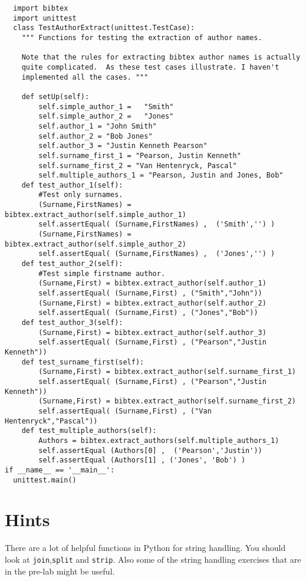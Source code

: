 \documentclass[10pt]{paper}
\begin{document}
\begin{lstlisting}
  import bibtex
  import unittest
  class TestAuthorExtract(unittest.TestCase):
    """ Functions for testing the extraction of author names.

    Note that the rules for extracting bibtex author names is actually
    quite complicated.  As these test cases illustrate. I haven't
    implemented all the cases. """

    def setUp(self):
        self.simple_author_1 =   "Smith"
        self.simple_author_2 =   "Jones"
        self.author_1 = "John Smith"
        self.author_2 = "Bob Jones"
        self.author_3 = "Justin Kenneth Pearson"
        self.surname_first_1 = "Pearson, Justin Kenneth"
        self.surname_first_2 = "Van Hentenryck, Pascal"
        self.multiple_authors_1 = "Pearson, Justin and Jones, Bob"
    def test_author_1(self):
        #Test only surnames.
        (Surname,FirstNames) = bibtex.extract_author(self.simple_author_1)
        self.assertEqual( (Surname,FirstNames) ,  ('Smith','') )
        (Surname,FirstNames) = bibtex.extract_author(self.simple_author_2)
        self.assertEqual( (Surname,FirstNames) ,  ('Jones','') )
    def test_author_2(self):
        #Test simple firstname author.
        (Surname,First) = bibtex.extract_author(self.author_1)
        self.assertEqual( (Surname,First) , ("Smith","John"))
        (Surname,First) = bibtex.extract_author(self.author_2)
        self.assertEqual( (Surname,First) , ("Jones","Bob"))
    def test_author_3(self):
        (Surname,First) = bibtex.extract_author(self.author_3)
        self.assertEqual( (Surname,First) , ("Pearson","Justin Kenneth"))
    def test_surname_first(self):
        (Surname,First) = bibtex.extract_author(self.surname_first_1)
        self.assertEqual( (Surname,First) , ("Pearson","Justin Kenneth"))
        (Surname,First) = bibtex.extract_author(self.surname_first_2)
        self.assertEqual( (Surname,First) , ("Van Hentenryck","Pascal"))
    def test_multiple_authors(self):
        Authors = bibtex.extract_authors(self.multiple_authors_1)
        self.assertEqual (Authors[0] ,  ('Pearson','Justin'))
        self.assertEqual (Authors[1] , ('Jones', 'Bob') )
if __name__ == '__main__':
  unittest.main()
\end{lstlisting}


\section*{Hints}
There are a lot of helpful functions in Python for string handling. You
should look at {\tt join},{\tt split} and {\tt strip}. Also some of
the string handling exercises that are in the pre-lab might be useful. 



\end{document}
